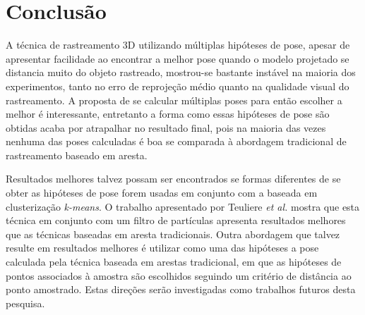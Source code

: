\chapter{Conclusão}

A técnica de rastreamento 3D utilizando múltiplas hipóteses de pose, apesar de apresentar facilidade ao encontrar a melhor pose quando o modelo projetado se distancia muito do objeto rastreado, mostrou-se bastante instável na maioria dos experimentos, tanto no erro de reprojeção médio quanto na qualidade visual do rastreamento. A proposta de se calcular múltiplas poses para então escolher a melhor é interessante, entretanto a forma como essas hipóteses de pose são obtidas acaba por atrapalhar no resultado final, pois na maioria das vezes nenhuma das poses calculadas é boa se comparada à abordagem tradicional de rastreamento baseado em aresta.

Resultados melhores talvez possam ser encontrados se formas diferentes de se obter as hipóteses de pose forem usadas em conjunto com a baseada em clusterização \emph{k-means}. O trabalho apresentado por Teuliere \emph{et al.} \cite{celine} mostra que esta técnica em conjunto com um filtro de partículas apresenta resultados melhores que as técnicas baseadas em aresta tradicionais. Outra abordagem que talvez resulte em resultados melhores é utilizar como uma das hipóteses a pose calculada pela técnica baseada em arestas tradicional, em que as hipóteses de pontos associados à amostra são escolhidos seguindo um critério de distância ao ponto amostrado. Estas direções serão investigadas como trabalhos futuros desta pesquisa.
